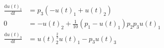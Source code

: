 \begin{align}
\frac{\mathrm{d} u\left( t \right)_{1}}{\mathrm{d}t} &= p_{3} \left(  - u\left( t \right)_{1} + u\left( t \right)_{2} \right) \\
0 &=  - u\left( t \right)_{2} + \frac{1}{10} \left( p_{1} - u\left( t \right)_{1} \right) p_{2} p_{3} u\left( t \right)_{1} \\
\frac{\mathrm{d} u\left( t \right)_{3}}{\mathrm{d}t} &= u\left( t \right)_{2}^{\frac{2}{3}} u\left( t \right)_{1} - p_{3} u\left( t \right)_{3}
\end{align}
